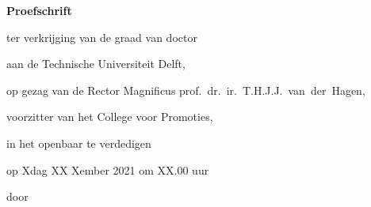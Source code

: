 \begin{titlepage}

\begin{center}

\vspace*{2\bigskipamount}

{\makeatletter
\titlestyle\bfseries\LARGE\@title
\makeatother}

{\makeatletter
\ifx\@subtitle\undefined\else
    \bigskip
    \titlefont\titleshape\Large\@subtitle
\fi
\makeatother}

\end{center}

\cleardoublepage
\thispagestyle{empty}

\begin{center}


\vspace*{2\bigskipamount}

{\makeatletter
\titlestyle\bfseries\LARGE\@title
\makeatother}

{\makeatletter
\ifx\@subtitle\undefined\else
    \bigskip
    \titlefont\titleshape\Large\@subtitle
\fi
\makeatother}

\vfill


{\Large\titlefont\bfseries Proefschrift}

\bigskip
\bigskip

ter verkrijging van de graad van doctor

aan de Technische Universiteit Delft,

op gezag van de Rector Magnificus prof.~dr.~ir.~T.H.J.J.~van~der~Hagen,

voorzitter van het College voor Promoties,

in het openbaar te verdedigen

op Xdag XX Xember 2021 om XX.00 uur

\bigskip
\bigskip

door

\bigskip
\bigskip

\makeatletter
{\Large\titlefont\bfseries\@firstname\ \titleshape{\MakeUppercase{\@lastname}}}
\makeatother


\end{center}
\end{titlepage}
